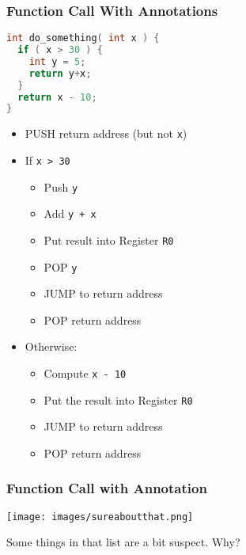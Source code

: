 \begin{frame}[fragile]
\frametitle{Function Call With Annotations}

\begin{lstlisting}[language=C]
int do_something( int x ) {
  if ( x > 30 ) {
    int y = 5;
    return y+x;
  }
  return x - 10;
}
\end{lstlisting}

\begin{itemize}
	\item PUSH return address (but not \texttt{x})
	\item If \texttt{x > 30}
		\begin{itemize}
			\item Push \texttt{y}
			\item Add \texttt{y + x}
			\item Put result into Register \texttt{R0}
			\item POP \texttt{y}
			\item JUMP to return address
			\item POP return address
		\end{itemize}
	\item Otherwise:
		\begin{itemize}
		\item Compute \texttt{x - 10}
		\item Put the result into Register \texttt{R0}
		\item JUMP to return address
		\item POP return address
	\end{itemize}
\end{itemize}


\end{frame}


\begin{frame}
\frametitle{Function Call with Annotation}

\begin{center}
	\texttt{[image: images/sureaboutthat.png]}
\end{center}

Some things in that list are a bit suspect. Why?

\end{frame}


